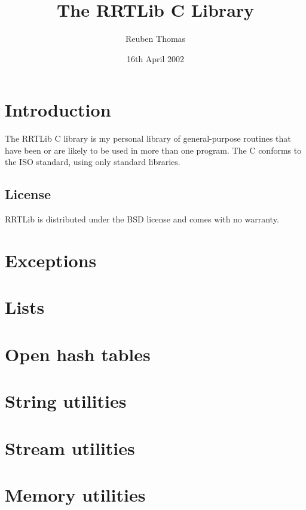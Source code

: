 \documentclass[english,twoside]{scrreprt}
\begin{document}
\title{The RRTLib C Library}
\author{Reuben Thomas}
\date{16th April 2002}
\maketitle

\tableofcontents


\chapter{Introduction}

The RRTLib C library is my personal library of general-purpose
routines that have been or are likely to be used in more than one
program. The C conforms to the ISO standard, using only standard
libraries.


\section{License}

RRTLib is distributed under the BSD license and comes with no
warranty.



\chapter{Exceptions}
%

\chapter{Lists}
%

\chapter{Open hash tables}
%

\chapter{String utilities}
%

\chapter{Stream utilities}
%

\chapter{Memory utilities}
%
\end{document}
